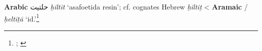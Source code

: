 \begin{etymology}\label{ety:hiltit}
\textbf{Arabic} {حلتيت} \textit{ḥiltīt} `asafoetida resin'; cf. cognates Hebrew  \textit{ḥiltiṯ}
< \textbf{Aramaic} {/} \textit{ḥeltīṯā} `id.'\footnote{\textcite[140]{fraenkel_aramaischen_1886}; \textcites[36]{low_aramaeische_1881}[vol. 3, p. 452-455]{low_flora_1924}}
\end{etymology}